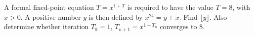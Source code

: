 A formal fixed-point equation $T=x^{1+T}$ is required to have the value $T=8$, with $x>0$. A positive number $y$ is then defined by $x^{24}=y+x$. Find $\lfloor y\rfloor$. Also determine whether iteration $T_0=1$, $T_{n+1}=x^{1+T_n}$ converges to $8$.
